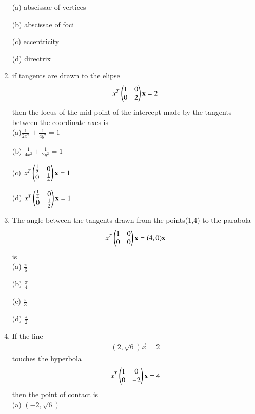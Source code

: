 \documentclass[journal,12pt,twocolumn]{IEEEtran}
\begin{document}
\begin{enumerate}
    \choice (a) abscissae of vertices
    
    \choice (b) abscissae of foci
    
    \choice (c) eccentricity
    
    \choice (d) directrix\\
    
    \item if tangents are drawn to the elipse \begin{align} x^T\begin{pmatrix}1&0\\0&2\end{pmatrix}\mathbf x=2\end{align} then the locus of the mid point of the intercept made by the tangents between the coordinate axes is\\
    \choice (a)$\frac{1}{2x^2}+\frac{1}{4y^2}=1$
    
    \choice (b) $\frac{1}{4x^2}+\frac{1}{2y^2}=1$
    
    \choice (c) $ x^T\begin{pmatrix}\frac{1}{2}&0\\0&\frac{1}{4}\end{pmatrix}\mathbf x=1$
    
    \choice (d) $ x^T\begin{pmatrix}\frac{1}{4}&0\\0&\frac{1}{2}\end{pmatrix}\mathbf x=1$\\
    
    \item The angle between the tangents drawn from the points(1,4) to the parabola \begin{align} x^T\begin{pmatrix}
    1 & 0 \\0 & 0\end{pmatrix}\mathbf x=(4,0)\mathbf x \end{align} is\\ 
    
    \choice (a) $\frac{\pi}{6}$
    
    \choice (b) $\frac{\pi}{4}$
    
    \choice (c) $\frac{\pi}{3}$
    
    \choice (d) $\frac{\pi}{2}$\\
    
    \item If the line \begin{align}(2,\sqrt{6})\vec x=2\end{align} touches the hyperbola\begin{align}x^T\begin{pmatrix}1 & 0 \\0 & -2\end{pmatrix} \mathbf x=4\end{align}then the point of contact is\\ 
    
    \choice (a) $(-2,\sqrt{6})$
    

\end{enumerate}
\end{document}
